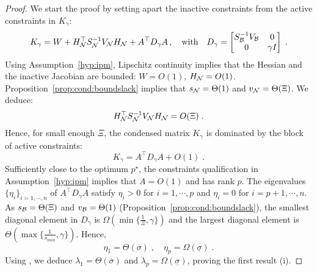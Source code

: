 \begin{proof}
  We start the proof by setting apart the inactive constraints from the active constraints in $K_\gamma$:
  \begin{equation}
    K_\gamma = W + H_{\mathcal{N}}^\top S_{\mathcal{N}}^{-1} V_{\mathcal{N}} H_{\mathcal{N}}
    + A^\top D_\gamma A \, ,
    \quad
    \text{with} \quad D_\gamma = \begin{bmatrix} S_{\mathcal{B}}^{-1} V_{\mathcal{B}} & 0 \\ 0 & \gamma I \end{bmatrix} \; .
  \end{equation}
  Using Assumption~\ref{hyp:ipm}, Lipschitz
  continuity implies that the Hessian and the inactive Jacobian
  are bounded: $W = O(1)$, $H_{\mathcal{N}} = O(1)$.
  Proposition~\ref{prop:cond:boundslack} implies that
  $s_{\mathcal{N}} = \Theta(1)$ and $v_{\mathcal{N}} = \Theta(\Xi)$. We deduce:
  \begin{equation}
    \label{eq:cond:inactiveblock}
    H_{\mathcal{N}}^\top S_{\mathcal{N}}^{-1} V_{\mathcal{N}} H_{\mathcal{N}} = O(\Xi) \; .
  \end{equation}
  Hence, for small enough $\Xi$,
  the condensed matrix $K_\gamma$ is dominated by the block of active constraints:
  \begin{equation}
    K_\gamma = A^\top D_\gamma A + O(1) \; .
  \end{equation}
  Sufficiently close to the optimum $p^\star$, the constraints qualification
  in Assumption~\ref{hyp:ipm} implies that $A = O(1)$ and has rank $p$.
  The eigenvalues $\{\eta_i\}_{i =1,\cdots,n}$ of $A^\top D_\gamma A$
  satisfy $\eta_i > 0$ for $i = 1,\cdots,p$ and $\eta_i = 0$ for $i = p+1, \cdots, n$.
  As $s_{\mathcal{B}} = \Theta(\Xi)$ and $v_{\mathcal{B}} = \Theta(1)$
  (Proposition~\ref{prop:cond:boundslack}), the smallest diagonal
  element in $D_\gamma$ is $\Omega(\min\{\frac{1}{\Xi}, \gamma\})$
  and the largest diagonal element is $\Theta(\max\{\frac{1}{s_{min}}, \gamma\})$.
  Hence,
  \begin{equation}
    \eta_1 = \Theta(\overline{\sigma}) \; , \quad
    \eta_p = \Omega(\underline{\sigma}) \; .
  \end{equation}
  Using \cite[Lemma 3.1]{wright1998ill}, we deduce $\lambda_1 = \Theta(\overline{\sigma})$
  and $\lambda_p = \Omega(\underline{\sigma})$, proving the first result (i).


\end{proof}
